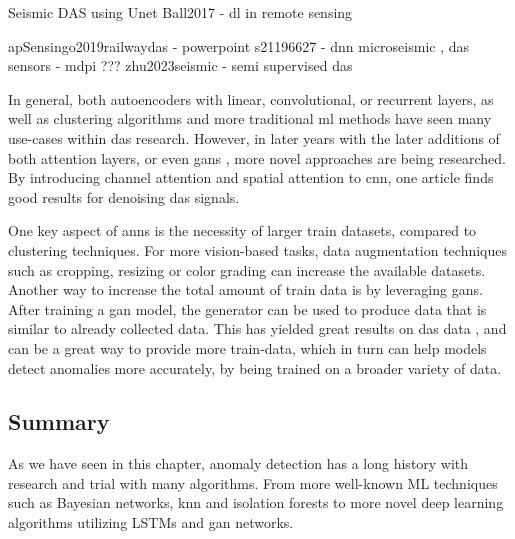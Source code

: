Seismic DAS using Unet \cite{zhu2023seismic}
Ball2017 - dl in remote sensing

apSensingo2019railwaydas - powerpoint
s21196627 - dnn microseismic , das
sensors - mdpi ???
zhu2023seismic - semi supervised das

In general, both autoencoders with linear, convolutional, or recurrent layers, as well as clustering algorithms and more traditional \acrshort{ml} methods have seen many use-cases within \acrshort{das} research. However, in later years with the later additions of both attention layers, or even \acrshort{gan}s \cite{goodfellow2014generative, goodfellow2016nips}, more novel approaches are being researched. By introducing channel attention and spatial attention to \acrshort{cnn}, one article \cite{eage:/content/journals/10.1111/1365-2478.13355} finds good results for denoising \acrshort{das} signals. 

One key aspect of \acrshort{ann}s is the necessity of larger train datasets, compared to clustering techniques. For more vision-based tasks, data augmentation techniques such as cropping, resizing or color grading can increase the available datasets. Another way to increase the total amount of train data is by leveraging \acrshort{gan}s. After training a \acrshort{gan} model, the generator can be used to produce data that is similar to already collected data. This has yielded great results on \acrshort{das} data \cite{Shiloh:19}, and can be a great way to provide more train-data, which in turn can help models detect anomalies more accurately, by being trained on a broader variety of data. \\


\subsection{Summary}

As we have seen in this chapter, anomaly detection has a long history with research and trial with many algorithms. From more well-known ML techniques such as Bayesian networks, knn and isolation forests to more novel deep learning algorithms utilizing LSTMs and \acrshort{gan} networks. \\

